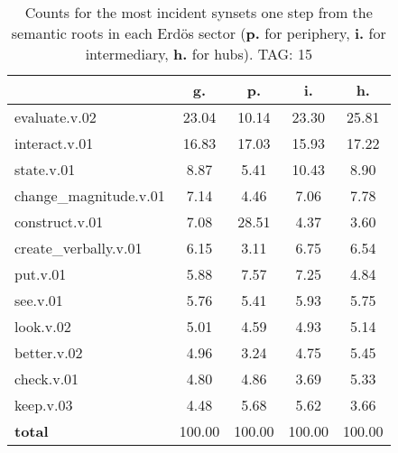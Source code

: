 \begin{table}[h!]
\begin{center}
\begin{tabular}{| l || c | c | c | c |}\hline
 & {\bf g.} & {\bf p.} & {\bf i.} & {\bf h.} \\\hline\hline
evaluate.v.02 & 23.04  & 10.14  & 23.30  & 25.81 \\\hline
interact.v.01 & 16.83  & 17.03  & 15.93  & 17.22 \\\hline
state.v.01 & 8.87  & 5.41  & 10.43  & 8.90 \\\hline
change\_magnitude.v.01 & 7.14  & 4.46  & 7.06  & 7.78 \\\hline
construct.v.01 & 7.08  & 28.51  & 4.37  & 3.60 \\\hline
create\_verbally.v.01 & 6.15  & 3.11  & 6.75  & 6.54 \\\hline
put.v.01 & 5.88  & 7.57  & 7.25  & 4.84 \\\hline
see.v.01 & 5.76  & 5.41  & 5.93  & 5.75 \\\hline
look.v.02 & 5.01  & 4.59  & 4.93  & 5.14 \\\hline
better.v.02 & 4.96  & 3.24  & 4.75  & 5.45 \\\hline
check.v.01 & 4.80  & 4.86  & 3.69  & 5.33 \\\hline
keep.v.03 & 4.48  & 5.68  & 5.62  & 3.66 \\\hline\hline
{{\bf total}} & 100.00  & 100.00  & 100.00  & 100.00 \\\hline
\end{tabular}
\caption{Counts for the most incident synsets one step from the semantic roots in each Erd\"os sector ({\bf p.} for periphery, {\bf i.} for intermediary, {\bf h.} for hubs). TAG: 15}
\end{center}
\end{table}